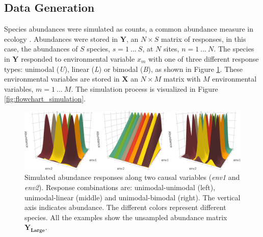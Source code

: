 \documentclass[a4paper,11pt]{article}
\begin{document}
	\subsection{Data Generation}
		Species abundances were simulated as counts, a common abundance measure in ecology \citep{Warton2008}. 
		Abundances were stored in $\mathbf{Y}$, an $N \times S$ matrix of responses, in this case, the abundances of $S$ species, $ s= 1\ ...\ S$, at $N$ sites, $ n = 1\ ...\ N$.
		The species in $\mathbf{Y}$ responded to  environmental variable $x_m$ with one of three different response types: unimodal (\textit{U}), linear (\textit{L}) or bimodal (\textit{B}), as shown in Figure \ref{fig:bivariateExample}.
		These environmental variables are stored in $\mathbf{X}$ an $N \times M$ matrix with $M$ environmental variables, $m = 1\ ... \ M$. 
	    The simulation process is visualized in Figure \ref{fig:flowchart_simulation}. 
	    
	    
		\begin{figure}[ht]
			
			\begin{center}
			    
			    \includegraphics[width = 1\linewidth]{figures/Communities_trimmed_appended.png}     
			   	\caption{
			                Simulated abundance responses along two causal variables (\textit{env1} and \textit{env2}). 
                            Response combinations are: unimodal-unimodal (left), unimodal-linear (middle) and unimodal-bimodal (right). 
                			The vertical axis indicates abundance. 
                			The different colors represent different species.
                			All the examples show the unsampled abundance matrix
                			$\mathbf{Y_{Large}}$.
			            }
			\label{fig:bivariateExample} 
			\end{center}
			

		\end{figure}
        
\end{document}
